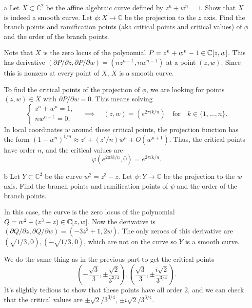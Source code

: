 \documentclass{lkx_pset}
\begin{document}
\begin{parts}
  \begin{part}{a}
  Let $X \subset \mathbb{C}^2$ be the affine algebraic curve defined by $z^n + w^n = 1$. Show that $X$ is indeed a smooth curve. Let $\phi : X \rightarrow \mathbb{C}$ be the projection to the $z$ axis. Find the branch points and ramification points (aka critical points and critical values) of $ \phi $ and the order of the branch points.
  \end{part}

  Note that $X$ is the zero locus of the polynomial $P =z^n+w^n-1\in \mathbb{C}[z, w]$. This has derivative $(\partial P/\partial z, \partial P/\partial w)=(nz^{n-1}, nw^{n-1})$ at a point $(z,w)$. Since this is nonzero at every point of $X$, $X$ is a smooth curve.

  To find the critical points of the projection of $\phi$, we are looking for points $(z,w)\in X$ with $\partial P/\partial w = 0$. This means solving
  \[
    \begin{cases}
      z^n + w^n=1,\\ nw^{n-1}=0,
    \end{cases} \quad\implies \quad (z,w) = (e^{2\pi i k/n})\quad\textrm{for}\quad k\in \{1, \ldots, n\}.
  \]
  In local coordinates $w$ around these critical points, the projection function has the form $(1-w^n)^{1/n}\approx z' + (z'/n)w^n + O(w^{n+1})$. Thus, the critical points have order $n$, and the critical values are
  \[
  \varphi(e^{2\pi i k / n}, 0) = e^{2\pi i k /n}.
  \]

  \begin{part}{b}
  Let $ Y \subset \mathbb{C}^2 $ be the curve $ w^2 = z^3 - z $. Let $ \psi : Y \rightarrow \mathbb{C} $ be the projection to the $ w $ axis. Find the branch points and ramification points of $ \psi $ and the order of the branch points.
  \end{part}
  In this case, the curve is the zero locus of the polynomial $Q = w^2-(z^3-z)\in \mathbb{C}[z, w]$. Now the derivative is $(\partial Q/\partial z, \partial Q/\partial w)=(-3z^2+1, 2w)$. The only zeroes of this derivative are $(\sqrt{1/3}, 0), (-\sqrt{1/3}, 0)$, which are not on the curve so $Y$ is a smooth curve.

  We do the same thing as in the previous part to get the critical points 
  \[
    \left(-\frac{\sqrt{3}}{3}, \pm\frac{\sqrt{2}}{3^{3/4}}\right), 
    \left(\frac{\sqrt{3}}{3}, \pm\frac{i\sqrt{2}}{3^{3/4}}\right).
  \]
  It's slightly tedious to show that these points have all order $2$, and we can check that the critical values are $\pm \sqrt{2}/3^{3/4}$, $\pm i\sqrt{2}/3^{3/4}$.
\end{parts}
\end{document}
